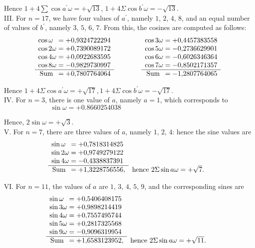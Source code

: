 \documentclass[twoside,12pt]{memoir}
\begin{document}
Hence \(1+4 \sum \cos a^{\prime} \omega=+\sqrt{13}\), \(1+4 \Sigma \cos b^{\prime} \omega=-\sqrt{13}\).\\
%

III. For \(n=17\), we have four values of \(a^\prime\), namely \(1\), \(2\), \(4\), \(8\), and an equal number of values of \(b^\prime\), namely \(3\), \(5\), \(6\), \(7\). From this, the cosines are computed as follows:
\[\begin{array}{r}
\cos \omega\phantom{1}  =+0{,}9324722294 \\
\cos 2 \omega  =+0{,}7390089172 \\
\cos 4 \omega  =+0{,}0922683595 \\
\cos 8 \omega  =-0{,}9829730997 \\
\hline \text{Sum\phantom{a}} =+0{,}7807764064 
\end{array}
\qquad \qquad
\begin{array}{r}
\cos 3 \omega  =+0{,}4457383558 \\
\cos 5 \omega  =-0{,}2736629901 \\
\cos 6 \omega  =-0{,}6026346364 \\
\cos 7 \omega  =-0{,}8502171357 \\
\hline \text{Sum\phantom{a}} =-1{,}2807764065
\end{array}\]

Hence \(1+4 \Sigma \cos a^{\prime} \omega=+\sqrt{17},1+4 \Sigma \cos b^{\prime} \omega=-\sqrt{17}\).\\
%

IV. For \(n=3\), there is one value of \(a\), namely \(a=1\), which corresponds to 
\[\sin \omega=+0.8660254038 \quad\quad \phantom{\sin \omega=+0.8660254038}\]
 
Hence, \(2 \sin \omega=+\sqrt{3}\).\\
%

V. For \(n=7\), there are three values of \(a\), namely \(1\), \(2\), \(4\): hence the sine values are
\[\begin{array}{rl}
 \sin \omega\phantom{1} =+0{,}7818314825 \phantom{,}&\\
\sin 2 \omega  =+0{,}9749279122 \phantom{,}&\\
\sin 4 \omega  =-0{,}4338837391 \phantom{,}&\\
\cline{1-1} \text{Sum\phantom{a}}  =+1{,}3228756556,& \text{hence } 2 \Sigma \sin a \omega=+\sqrt{7}.
\end{array}\]
%

VI. For \(n=11\), the values of \(a\) are \(1\), \(3\), \(4\), \(5\), \(9\), and the corresponding sines are
\[\begin{array}{rl}
\sin \omega\phantom{1}  =+0{,}5406408175 \phantom{,}&\\
\sin 3 \omega  =+0{,}9898214419 \phantom{,}&\\
\sin 4 \omega  =+0{,}7557495744 \phantom{,}&\\
\sin 5 \omega  =+0{,}2817325568 \phantom{,}&\\
\sin 9 \omega  =-0{,}9096319954 \phantom{,}&\\
\cline{1-1} \text{Sum\phantom{a}} =+1{,}6583123952,& \text{hence } 2 \Sigma \sin a \omega=+\sqrt{11}.
\end{array}\]
%
\end{document}
